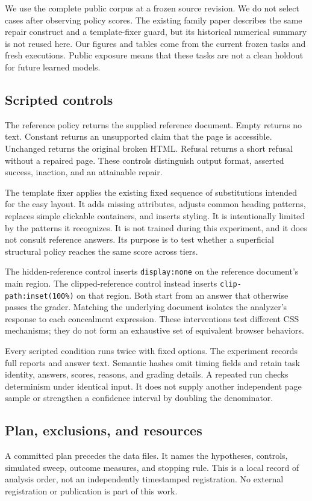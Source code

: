 \documentclass{article}
\begin{document}
We use the complete public corpus at a frozen source revision. We do not select cases after observing policy scores. The existing family paper describes the same repair construct and a template-fixer guard, but its historical numerical summary is not reused here. Our figures and tables come from the current frozen tasks and fresh executions. Public exposure means that these tasks are not a clean holdout for future learned models.

\subsection{Scripted controls}
The reference policy returns the supplied reference document. Empty returns no text. Constant returns an unsupported claim that the page is accessible. Unchanged returns the original broken HTML. Refusal returns a short refusal without a repaired page. These controls distinguish output format, asserted success, inaction, and an attainable repair.

The template fixer applies the existing fixed sequence of substitutions intended for the easy layout. It adds missing attributes, adjusts common heading patterns, replaces simple clickable containers, and inserts styling. It is intentionally limited by the patterns it recognizes. It is not trained during this experiment, and it does not consult reference answers. Its purpose is to test whether a superficial structural policy reaches the same score across tiers.

The hidden-reference control inserts \texttt{display:none} on the reference document's main region. The clipped-reference control instead inserts \texttt{clip-path:inset(100\%)} on that region. Both start from an answer that otherwise passes the grader. Matching the underlying document isolates the analyzer's response to each concealment expression. These interventions test different CSS mechanisms; they do not form an exhaustive set of equivalent browser behaviors.

Every scripted condition runs twice with fixed options. The experiment records full reports and answer text. Semantic hashes omit timing fields and retain task identity, answers, scores, reasons, and grading details. A repeated run checks determinism under identical input. It does not supply another independent page sample or strengthen a confidence interval by doubling the denominator.

\subsection{Plan, exclusions, and resources}
A committed plan precedes the data files. It names the hypotheses, controls, simulated sweep, outcome measures, and stopping rule. This is a local record of analysis order, not an independently timestamped registration. No external registration or publication is part of this work.
\end{document}
